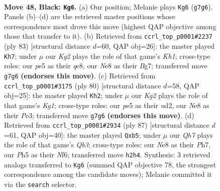 \documentclass[11pt]{article}
\begin{document}
\clearpage

\begin{figure}[p]\centering
\begin{subfigure}{0.46\textwidth}\centering
\resizebox{\linewidth}{!}{%
\newchessgame
\chessboard[
  setfen={4n3/3b2k1/p7/3PPp1p/6p1/N7/4KP1q/Q5N1 b - - 0 48},
  showmover=false,
  pgfstyle=straightmove, color=movearrow, markmove={g7-g6}
]}
\caption{}
\end{subfigure}\hfill
\begin{subfigure}{0.46\textwidth}\centering
\resizebox{\linewidth}{!}{%
\newchessgame
\chessboard[
  setfen={4Q2k/6b1/7p/2p1p1pP/2P5/p5P1/q4NK1/8 b - - 5 42},
  showmover=false,
  pgfstyle=straightmove, color=movearrow, markmove={h8-h7}
]}
\caption{}
\end{subfigure}
\\[4pt]
\begin{subfigure}{0.46\textwidth}\centering
\resizebox{\linewidth}{!}{%
\newchessgame
\chessboard[
  setfen={6k1/5p2/p5p1/P2Q4/6N1/4P1PP/3n4/2q3K1 w - - 1 41},
  showmover=false,
  pgfstyle=straightmove, color=movearrow, markmove={g1-h2}
]}
\caption{}
\end{subfigure}\hfill
\begin{subfigure}{0.46\textwidth}\centering
\resizebox{\linewidth}{!}{%
\newchessgame
\chessboard[
  setfen={1k6/7p/1q3np1/pN3p2/8/2Q3P1/2N2P1P/6K1 b - - 0 44},
  showmover=false,
  pgfstyle=straightmove, color=movearrow, markmove={b6-b5}
]}
\caption{}
\end{subfigure}
\caption{\textbf{Move 48, Black: \texttt{Kg6}.} (a) Our position; Melanie plays \texttt{Kg6} (\texttt{g7g6}). Panels (b)--(d) are the retrieved master positions whose correspondence most drove this move (highest QAP objective among those that transfer to it). (b) Retrieved from \texttt{ccrl\_top\_p0001\#2237} (ply 83) [structural distance $d$=60, QAP obj=26]: the master played \texttt{Kh7}; under $\mu$ our \emph{Kg2} plays the role of that game's \emph{Kh1}; cross-type roles: our \emph{p}e5 as their \emph{q}e8, our \emph{N}e8 as their \emph{B}g7; transferred move \texttt{g7g6} \textbf{(endorses this move)}. (c) Retrieved from \texttt{ccrl\_top\_p0001\#3175} (ply 80) [structural distance $d$=58, QAP obj=25]: the master played \texttt{Kh2}; under $\mu$ our \emph{Kg2} plays the role of that game's \emph{Kg1}; cross-type roles: our \emph{p}e5 as their \emph{n}d2, our \emph{N}e8 as their \emph{P}e3; transferred move \texttt{g7g6} \textbf{(endorses this move)}. (d) Retrieved from \texttt{ccrl\_top\_p0001\#2934} (ply 87) [structural distance $d$=61, QAP obj=40]: the master played \texttt{Qxb5}; under $\mu$ our \emph{Qh7} plays the role of that game's \emph{Qb3}; cross-type roles: our \emph{N}e8 as their \emph{P}h7, our \emph{P}h5 as their \emph{N}f6; transferred move \texttt{h2h4}. Synthesis: 3 retrieved analogs transferred to \texttt{Kg6} (summed QAP objective 78, the strongest correspondence among the candidate moves); Melanie committed it via the \texttt{search} selector.}
\label{fig:thought-m95}
\end{figure}
\end{document}

